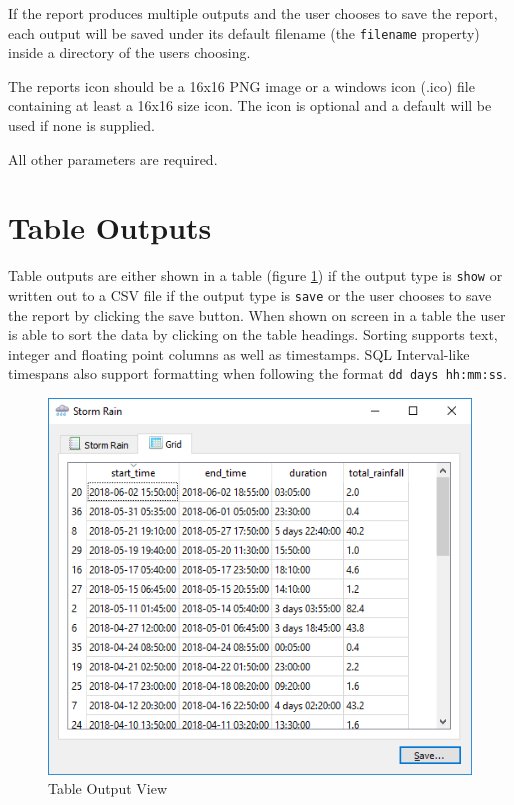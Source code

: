 \documentclass[a4paper,10pt]{book}
\begin{document}
If the report produces multiple outputs and the user chooses to save the report, each output will be saved under its default filename (the \verb|filename| property) inside a directory of the users choosing.

The reports icon should be a 16x16 PNG image or a windows icon (.ico) file containing at least a 16x16 size icon. The icon is optional and a default will be used if none is supplied.

All other parameters are required.

\section{Table Outputs}
Table outputs are either shown in a table (figure \ref{img_table_output}) if the output type is \verb|show| or written out to a CSV file if the output type is \verb|save| or the user chooses to save the report by clicking the save button. When shown on screen in a table the user is able to sort the data by clicking on the table headings. Sorting supports text, integer and floating point columns as well as timestamps. SQL Interval-like timespans also support formatting when following the format \verb|dd days hh:mm:ss|.

\begin {figure}[!ht]
 \centering
 \includegraphics[scale=0.5]{images/table_output}
 \caption{Table Output View}
 \label{img_table_output}
\end {figure}
\end{document}
